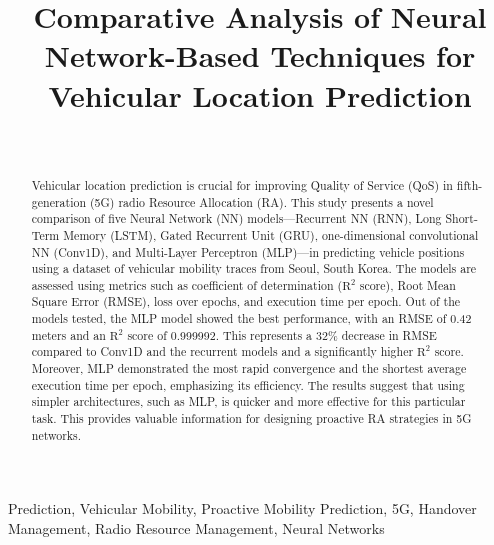 \documentclass[journal,onecolumn]{IEEEtran}
\begin{document}
\title{Comparative Analysis of Neural Network-Based Techniques for Vehicular Location Prediction}

\author{\\
}

\maketitle

\begin{abstract}
Vehicular location prediction is crucial for improving Quality of Service (QoS) in fifth-generation (5G) radio Resource Allocation (RA). This study presents a novel comparison of five Neural Network (NN) models—Recurrent NN (RNN), Long Short-Term Memory (LSTM), Gated Recurrent Unit (GRU), one-dimensional convolutional NN (Conv1D), and Multi-Layer Perceptron (MLP)—in predicting vehicle positions using a dataset of vehicular mobility traces from Seoul, South Korea. The models are assessed using metrics such as coefficient of determination ($\text{R}^2$ score), Root Mean Square Error (RMSE), loss over epochs, and execution time per epoch. Out of the models tested, the MLP model showed the best performance, with an RMSE of 0.42 meters and an $\text{R}^2$ score of 0.999992. This represents a 32\% decrease in RMSE compared to Conv1D and the recurrent models and a significantly higher $\text{R}^2$ score. Moreover, MLP demonstrated the most rapid convergence and the shortest average execution time per epoch, emphasizing its efficiency. The results suggest that using simpler architectures, such as MLP, is quicker and more effective for this particular task. This provides valuable information for designing proactive RA strategies in 5G networks.
\end{abstract}

\begin{IEEEkeywords}
Prediction, Vehicular Mobility, Proactive Mobility Prediction, 5G, Handover Management, Radio Resource Management, Neural Networks
\end{IEEEkeywords}
\clearpage
\end{document}
